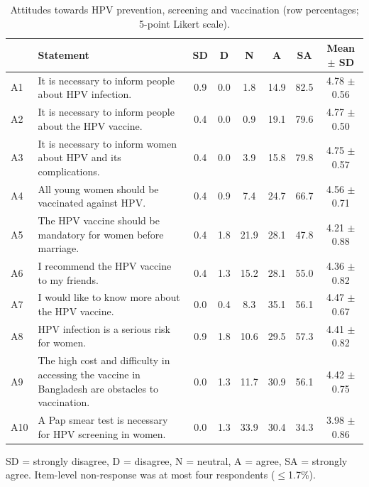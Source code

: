 \begin{table}[htbp]\centering\footnotesize
\caption{Attitudes towards HPV prevention, screening and vaccination (row percentages; 5-point Likert scale).}\label{tab:attitudes}
\begin{tabularx}{\textwidth}{@{}l >{\raggedright\arraybackslash}X ccccc c@{}}\toprule
 & Statement & SD & D & N & A & SA & Mean $\pm$ SD \\\midrule
A1 & It is necessary to inform people about HPV infection. & 0.9 & 0.0 & 1.8 & 14.9 & 82.5 & 4.78 $\pm$ 0.56 \\
A2 & It is necessary to inform people about the HPV vaccine. & 0.4 & 0.0 & 0.9 & 19.1 & 79.6 & 4.77 $\pm$ 0.50 \\
A3 & It is necessary to inform women about HPV and its complications. & 0.4 & 0.0 & 3.9 & 15.8 & 79.8 & 4.75 $\pm$ 0.57 \\
A4 & All young women should be vaccinated against HPV. & 0.4 & 0.9 & 7.4 & 24.7 & 66.7 & 4.56 $\pm$ 0.71 \\
A5 & The HPV vaccine should be mandatory for women before marriage. & 0.4 & 1.8 & 21.9 & 28.1 & 47.8 & 4.21 $\pm$ 0.88 \\
A6 & I recommend the HPV vaccine to my friends. & 0.4 & 1.3 & 15.2 & 28.1 & 55.0 & 4.36 $\pm$ 0.82 \\
A7 & I would like to know more about the HPV vaccine. & 0.0 & 0.4 & 8.3 & 35.1 & 56.1 & 4.47 $\pm$ 0.67 \\
A8 & HPV infection is a serious risk for women. & 0.9 & 1.8 & 10.6 & 29.5 & 57.3 & 4.41 $\pm$ 0.82 \\
A9 & The high cost and difficulty in accessing the vaccine in Bangladesh are obstacles to vaccination. & 0.0 & 1.3 & 11.7 & 30.9 & 56.1 & 4.42 $\pm$ 0.75 \\
A10 & A Pap smear test is necessary for HPV screening in women. & 0.0 & 1.3 & 33.9 & 30.4 & 34.3 & 3.98 $\pm$ 0.86 \\
\bottomrule\end{tabularx}

\vspace{2pt}\raggedright\scriptsize SD = strongly disagree, D = disagree, N = neutral, A = agree, SA = strongly agree. Item-level non-response was at most four respondents ($\leq$1.7\%).
\end{table}
